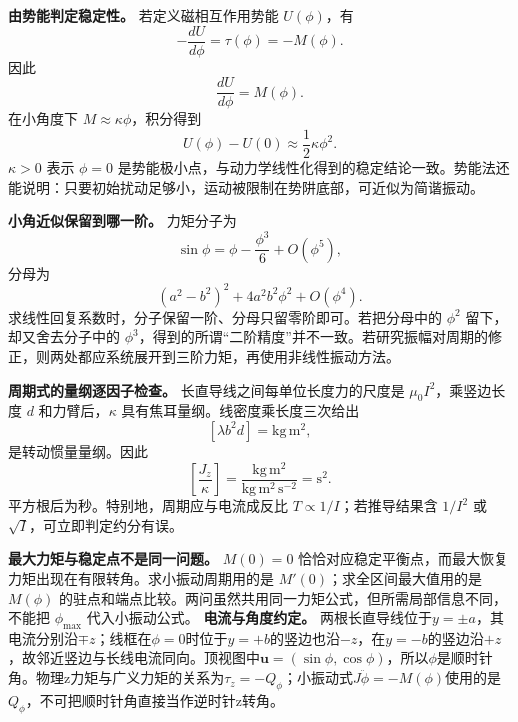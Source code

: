 \documentclass[12pt,a4paper,UTF8]{ctexart}
\begin{document}
\textbf{由势能判定稳定性。} 若定义磁相互作用势能 \(U(\phi)\)，有 \[
-\frac{dU}{d\phi}=\tau(\phi)=-M(\phi).
\] 因此 \[
\frac{dU}{d\phi}=M(\phi).
\] 在小角度下 \(M\approx\kappa\phi\)，积分得到 \[
U(\phi)-U(0)\approx\frac12\kappa\phi^2.
\] \(\kappa>0\) 表示 \(\phi=0\)
是势能极小点，与动力学线性化得到的稳定结论一致。势能法还能说明：只要初始扰动足够小，运动被限制在势阱底部，可近似为简谐振动。

\textbf{小角近似保留到哪一阶。} 力矩分子为 \[
\sin\phi=\phi-\frac{\phi^3}{6}+O(\phi^5),
\] 分母为 \[
(a^2-b^2)^2+4a^2b^2\phi^2+O(\phi^4).
\] 求线性回复系数时，分子保留一阶、分母只留零阶即可。若把分母中的
\(\phi^2\) 留下，却又舍去分子中的
\(\phi^3\)，得到的所谓``二阶精度''并不一致。若研究振幅对周期的修正，则两处都应系统展开到三阶力矩，再使用非线性振动方法。

\textbf{周期式的量纲逐因子检查。} 长直导线之间每单位长度力的尺度是
\(\mu_0I^2\)，乘竖边长度 \(d\) 和力臂后，\(\kappa\)
具有焦耳量纲。线密度乘长度三次给出 \[
[\lambda b^2d]=\mathrm{kg\,m^2},
\] 是转动惯量量纲。因此 \[
\left[\frac{J_z}{\kappa}\right]
=\frac{\mathrm{kg\,m^2}}{
\mathrm{kg\,m^2\,s^{-2}}}
=\mathrm{s^2}.
\] 平方根后为秒。特别地，周期应与电流成反比
\(T\propto1/I\)；若推导结果含 \(1/I^2\) 或
\(\sqrt I\)，可立即判定约分有误。

\textbf{最大力矩与稳定点不是同一问题。} \(M(0)=0\)
恰恰对应稳定平衡点，而最大恢复力矩出现在有限转角。求小振动周期用的是
\(M'(0)\)；求全区间最大值用的是 \(M(\phi)\)
的驻点和端点比较。两问虽然共用同一力矩公式，但所需局部信息不同，不能把
\(\phi_{\max}\) 代入小振动公式。 \textbf{电流与角度约定。}
两根长直导线位于\(y=\pm a\)，其电流分别沿\(\mp z\)；线框在\(\phi=0\)时位于\(y=+b\)的竖边也沿\(-z\)，在\(y=-b\)的竖边沿\(+z\)，故邻近竖边与长线电流同向。顶视图中\(\boldsymbol u=(\sin\phi,\cos\phi)\)，所以\(\phi\)是顺时针角。物理z力矩与广义力矩的关系为\(\tau_z=-Q_\phi\)；小振动式\(J\ddot\phi=-M(\phi)\)使用的是\(Q_\phi\)，不可把顺时针角直接当作逆时针z转角。
\end{document}

